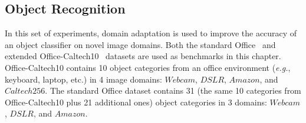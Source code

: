 \documentclass[graybox]{svmult}
\newcommand\eg{\emph{e.g.}}
\begin{document}
\subsection{Object Recognition}
\label{subsec:recog}
In this set of experiments, domain adaptation is used to improve the accuracy of an object classifier on novel image domains. Both the standard Office~\cite{saenko2010adapting} and extended Office-Caltech10~\cite{gfk} datasets are used as benchmarks in this chapter. Office-Caltech10 contains 10 object categories from an office environment (\eg, keyboard, laptop, etc.) in 4 image domains: $Webcam$, $DSLR$, $Amazon$, and $Caltech256$. The standard Office dataset contains 31 (the same 10 categories from Office-Caltech10 plus 21 additional ones) object categories in 3 domains: $Webcam$, $DSLR$, and $Amazon$.

\begin{table}
\centering
{}
\caption{\small Object recognition accuracies of all 12 domain shifts on the Office-Caltech10 dataset~\cite{gfk} with SURF features, following the protocol of~\cite{gfk,sa,gopalan-iccv11,ref:kulis_cvpr11,saenko2010adapting}.}
\label{tab:result_office-caltech10_surf}
\vspace{-0.1in}
\end{table}
\end{document}

